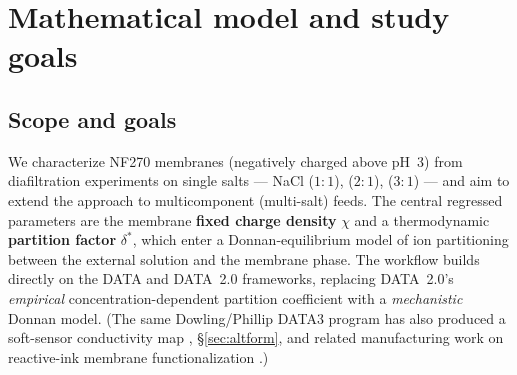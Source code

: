 \documentclass[11pt]{article}
\newcommand{\dstar}{\delta^{*}}
\begin{document}
\tableofcontents

\section{Mathematical model and study goals}\label{sec:model}

\subsection{Scope and goals}\label{sec:scope}
We characterize NF270 membranes (negatively charged above pH~3) from diafiltration
experiments on single salts --- NaCl ($1{:}1$),  ($2{:}1$), 
($3{:}1$) --- and aim to extend the approach to multicomponent (multi-salt)
feeds. The central regressed parameters are the membrane \textbf{fixed charge
density} $\chi$ and a thermodynamic \textbf{partition factor} $\dstar$, which
enter a Donnan-equilibrium model of ion partitioning between the external
solution and the membrane phase. The workflow builds directly on the DATA
\cite{ouimet2022data1} and DATA~2.0 \cite{liu2025data2}
frameworks, replacing DATA~2.0's \emph{empirical} concentration-dependent
partition coefficient with a \emph{mechanistic} Donnan model. (The same
Dowling/Phillip DATA3 program has also produced a soft-sensor conductivity
map \cite{lilonfe2025softsensors}, §\ref{sec:altform}, and related
manufacturing work on reactive-ink membrane functionalization
\cite{liu2024ink}.)
\end{document}

